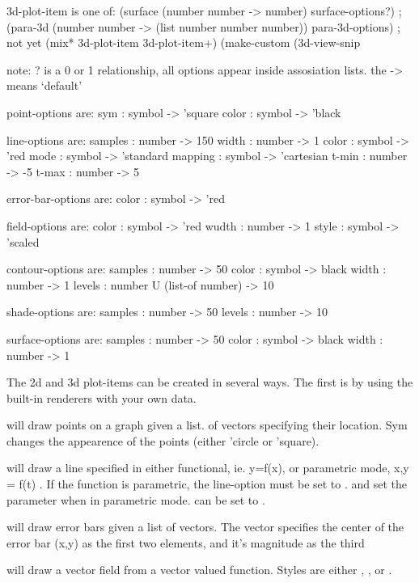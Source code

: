 \documentclass{article}
\begin{document}
{{{\begin{schemedisplay}
3d-plot-item is one of:
 (surface (number number -> number) surface-options?)
 ;(para-3d (number number -> (list number number number)) para-3d-options) ; not yet
 (mix* 3d-plot-item 3d-plot-item+)
 (make-custom (3d-view-snip%

note: ? is a 0 or 1 relationship, all options appear inside assosiation lists.
the -> means `default'

point-options are:
 sym : symbol -> 'square
 color : symbol -> 'black

line-options are:
 samples : number -> 150
 width : number -> 1
 color : symbol -> 'red
 mode : symbol -> 'standard
 mapping : symbol -> 'cartesian
 t-min : number -> -5
 t-max : number -> 5
 
error-bar-options are:
 color : symbol -> 'red

field-options are:
 color : symbol -> 'red
 wudth : number -> 1
 style : symbol -> 'scaled

contour-options are:
 samples : number -> 50
 color : symbol -> black
 width : number -> 1
 levels : number U (list-of number) -> 10

shade-options are:
 samples : number -> 50
 levels : number -> 10

surface-options are:
 samples : number -> 50
 color : symbol -> black
 width : number -> 1
 

     
\end{schemedisplay}



The 2d and 3d plot-items can be created in several ways. The first is by using the built-in renderers with your own data. 


 will draw points on a graph given a list. of vectors specifying their location. Sym changes the appearence of the points (either 'circle or 'square).


 will draw a line specified in either functional, ie. y=f(x), or  parametric mode, x,y = f(t) . If the function is parametric, the line-option  must be set to .  and  set the parameter when in parametric mode.  can be set to .


 will draw error bars given a list of vectors. The vector specifies the  center of the error bar (x,y) as the first two elements, and it's magnitude as the third


 will draw a vector field from a vector valued function. Styles are either , , or . 


}}}
\end{document}

